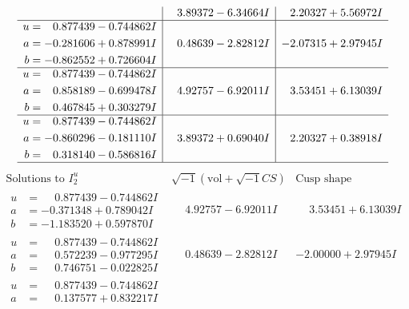\documentclass[1p]{elsarticle_modified}
\theoremstyle{definition}
\newcommand{\I}{\sqrt{-1}}
\begin{document}
$$\begin{array}{c|c|c}
 & \phantom{-}3.89372 - 6.34664 I & \phantom{-}2.20327 + 5.56972 I \\ \hline\begin{aligned}
u &= \phantom{-}0.877439 - 0.744862 I \\
a &= -0.281606 + 0.878991 I \\
b &= -0.862552 + 0.726604 I\end{aligned}
 & \phantom{-}0.48639 - 2.82812 I & -2.07315 + 2.97945 I \\ \hline\begin{aligned}
u &= \phantom{-}0.877439 - 0.744862 I \\
a &= \phantom{-}0.858189 - 0.699478 I \\
b &= \phantom{-}0.467845 + 0.303279 I\end{aligned}
 & \phantom{-}4.92757 - 6.92011 I & \phantom{-}3.53451 + 6.13039 I \\ \hline\begin{aligned}
u &= \phantom{-}0.877439 - 0.744862 I \\
a &= -0.860296 - 0.181110 I \\
b &= \phantom{-}0.318140 - 0.586816 I\end{aligned}
 & \phantom{-}3.89372 + 0.69040 I & \phantom{-}2.20327 + 0.38918 I\\
 \hline 
 \end{array}$$\newpage$$\begin{array}{c|c|c}  
\text{Solutions to }I^u_{2}& \I (\text{vol} + \sqrt{-1}CS) & \text{Cusp shape}\\
 \hline 
\begin{aligned}
u &= \phantom{-}0.877439 - 0.744862 I \\
a &= -0.371348 + 0.789042 I \\
b &= -1.183520 + 0.597870 I\end{aligned}
 & \phantom{-}4.92757 - 6.92011 I & \phantom{-}3.53451 + 6.13039 I \\ \hline\begin{aligned}
u &= \phantom{-}0.877439 - 0.744862 I \\
a &= \phantom{-}0.572239 - 0.977295 I \\
b &= \phantom{-}0.746751 - 0.022825 I\end{aligned}
 & \phantom{-}0.48639 - 2.82812 I & -2.00000 + 2.97945 I \\ \hline\begin{aligned}
u &= \phantom{-}0.877439 - 0.744862 I \\
a &= \phantom{-}0.137577 + 0.832217 I \\

\end{aligned}
\end{array}$$
\end{document}
